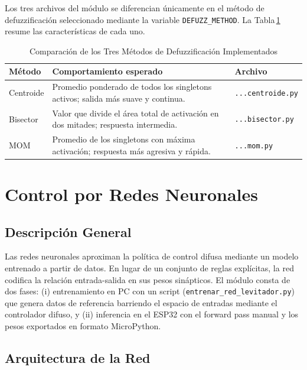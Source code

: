\documentclass[conference]{IEEEtran}
\begin{document}
Los tres archivos del módulo se diferencian únicamente en el método de defuzzificación seleccionado mediante la variable \texttt{DEFUZZ\_METHOD}. La Tabla\,\ref{tab:defuzz} resume las características de cada uno.

\begin{table}[H]
\centering
\caption{Comparación de los Tres Métodos de Defuzzificación Implementados}
\label{tab:defuzz}
\begin{tabularx}{\columnwidth}{lXX}
\toprule
\textbf{Método} & \textbf{Comportamiento esperado} & \textbf{Archivo} \\
\midrule
Centroide & Promedio ponderado de todos los singletons activos; salida más suave y continua.   & \texttt{...centroide.py} \\
Bisector  & Valor que divide el área total de activación en dos mitades; respuesta intermedia. & \texttt{...bisector.py}  \\
MOM       & Promedio de los singletons con máxima activación; respuesta más agresiva y rápida. & \texttt{...mom.py} \\
\bottomrule
\end{tabularx}
\end{table}

\section{Control por Redes Neuronales}
\label{sec:nn}

\subsection{Descripción General}

Las redes neuronales aproximan la política de control difusa mediante un modelo entrenado a partir de datos. En lugar de un conjunto de reglas explícitas, la red codifica la relación entrada-salida en sus pesos sinápticos. El módulo consta de dos fases: (i) entrenamiento en PC con un script (\texttt{entrenar\_red\_levitador.py}) que genera datos de referencia barriendo el espacio de entradas mediante el controlador difuso, y (ii) inferencia en el ESP32 con el forward pass manual y los pesos exportados en formato MicroPython.

\subsection{Arquitectura de la Red}
\end{document}
